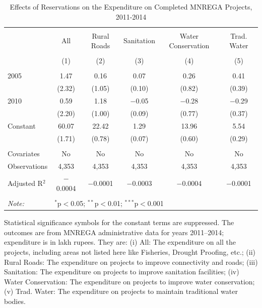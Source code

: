 \begin{table}[!htbp]
\centering
\begin{threeparttable}

  \caption{Effects of Reservations on the Expenditure on Completed MNREGA Projects, 2011-2014} 
  \label{main_mnrega_expenditure} 
\scriptsize 
\begin{tabular}{@{\extracolsep{0pt}}lccccc} 
\\[-1.8ex]\hline 
\hline \\[-1.8ex] 
 & All & Rural Roads & Sanitation & Water Conservation & Trad. Water \\ 
\\[-1.8ex] & (1) & (2) & (3) & (4) & (5)\\ 
\hline \\[-1.8ex] 
 2005 & 1.47 & 0.16 & 0.07 & 0.26 & 0.41 \\ 
  & (2.32) & (1.05) & (0.10) & (0.82) & (0.39) \\ 
  2010 & 0.59 & 1.18 & $-$0.05 & $-$0.28 & $-$0.29 \\ 
  & (2.20) & (1.00) & (0.09) & (0.77) & (0.37) \\ 
  Constant & 60.07 & 22.42 & 1.29 & 13.96 & 5.54 \\ 
  & (1.71) & (0.78) & (0.07) & (0.60) & (0.29) \\ 
 \hline \\[-1.8ex] 
Covariates & No & No & No & No & No \\ 
Observations & 4,353 & 4,353 & 4,353 & 4,353 & 4,353 \\ 
Adjusted R$^{2}$ & $-$0.0004 & $-$0.0001 & $-$0.0003 & $-$0.0004 & $-$0.0001 \\ 
\hline 
\hline \\[-1.8ex] 
\textit{Note:}  & \multicolumn{5}{l}{$^{*}$p$<$0.05; $^{**}$p$<$0.01; $^{***}$p$<$0.001} \\ 
\end{tabular} 
\begin{tablenotes}[flushleft]
\scriptsize
\item[] Statistical significance symbols for the constant terms are suppressed. The outcomes are from MNREGA administrative data for years 2011--2014; expenditure is in lakh rupees. They are: 
                     (i) All: The expenditure on all the projects, including areas not listed here like Fisheries, Drought Proofing, etc.;
                     (ii) Rural Roads: The expenditure on projects to improve connectivity and roads;
                     (iii) Sanitation: The expenditure on projects to improve sanitation facilities;
                     (iv) Water Conservation: The expenditure on projects to improve water conservation;
                     (v) Trad. Water: The expenditure on projects to maintain traditional water bodies.
\end{tablenotes}
\end{threeparttable}
\end{table}
